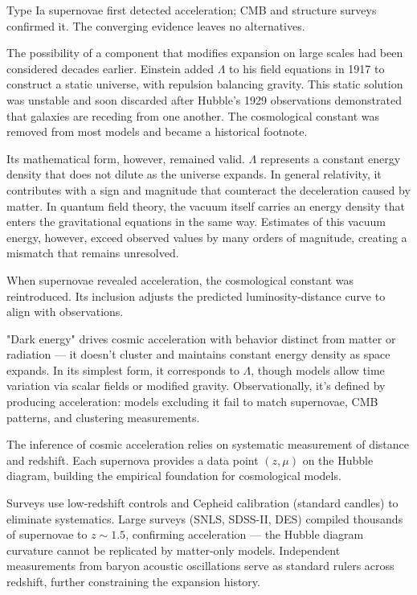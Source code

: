 Type Ia supernovae first detected acceleration; CMB and structure surveys confirmed it. The converging evidence leaves no alternatives.

The possibility of a component that modifies expansion on large scales had been considered decades earlier. Einstein added $\Lambda$ to his field equations in 1917 to construct a static universe, with repulsion balancing gravity. This static solution was unstable and soon discarded after Hubble's 1929 observations demonstrated that galaxies are receding from one another. The cosmological constant was removed from most models and became a historical footnote.

Its mathematical form, however, remained valid. $\Lambda$ represents a constant energy density that does not dilute as the universe expands. In general relativity, it contributes with a sign and magnitude that counteract the deceleration caused by matter. In quantum field theory, the vacuum itself carries an energy density that enters the gravitational equations in the same way. Estimates of this vacuum energy, however, exceed observed values by many orders of magnitude, creating a mismatch that remains unresolved.

When supernovae revealed acceleration, the cosmological constant was reintroduced. Its inclusion adjusts the predicted luminosity-distance curve to align with observations.

"Dark energy" drives cosmic acceleration with behavior distinct from matter or radiation — it doesn't cluster and maintains constant energy density as space expands. In its simplest form, it corresponds to $\Lambda$, though models allow time variation via scalar fields or modified gravity. Observationally, it's defined by producing acceleration: models excluding it fail to match supernovae, CMB patterns, and clustering measurements.

The inference of cosmic acceleration relies on systematic measurement of distance and redshift. Each supernova provides a data point $(z, \mu)$ on the Hubble diagram, building the empirical foundation for cosmological models.

Surveys use low-redshift controls and Cepheid calibration (standard candles) to eliminate systematics. Large surveys (SNLS, SDSS-II, DES) compiled thousands of supernovae to $z \sim 1.5$, confirming acceleration — the Hubble diagram curvature cannot be replicated by matter-only models. Independent measurements from baryon acoustic oscillations serve as standard rulers across redshift, further constraining the expansion history.

